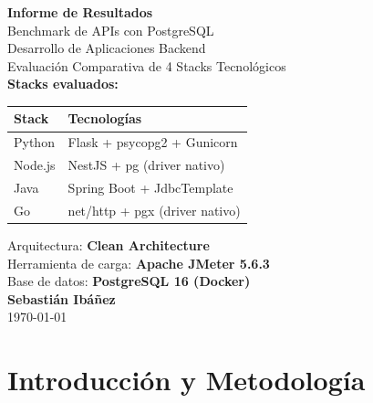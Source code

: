 \documentclass[12pt,a4paper]{article}
\begin{document}
\begin{titlepage}
    \centering
    \vspace*{3cm}
    
    {\Huge\bfseries Informe de Resultados}\\[0.5cm]
    {\LARGE Benchmark de APIs con PostgreSQL}\\[0.3cm]
    {\large Desarrollo de Aplicaciones Backend}\\[1cm]
    {\Large Evaluación Comparativa de 4 Stacks Tecnológicos}\\[2cm]
    
    {\large\textbf{Stacks evaluados:}}\\[0.5cm]
    \begin{tabular}{ll}
        \toprule
        \textbf{Stack} & \textbf{Tecnologías} \\
        \midrule
        Python & Flask + psycopg2 + Gunicorn \\
        Node.js & NestJS + pg (driver nativo) \\
        Java & Spring Boot + JdbcTemplate \\
        Go & net/http + pgx (driver nativo) \\
        \bottomrule
    \end{tabular}
    
    \vfill
    
    {\large Arquitectura: \textbf{Clean Architecture}}\\[0.5cm]
    {\large Herramienta de carga: \textbf{Apache JMeter 5.6.3}}\\[0.5cm]
    {\large Base de datos: \textbf{PostgreSQL 16 (Docker)}}\\[1cm]
    
    {\large\textbf{Sebastián Ibáñez}}\\[0.3cm]
    
    {\large \today}
\end{titlepage}

\tableofcontents
\newpage

\section{Introducción y Metodología}
\end{document}
